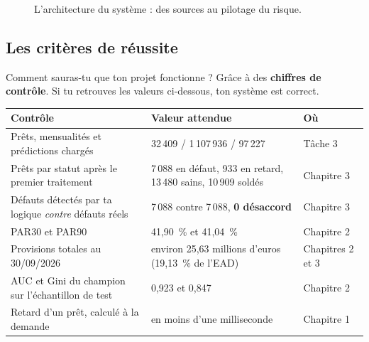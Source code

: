 \begin{figure}[ht]
\caption{L'architecture du système : des sources au pilotage du risque.}
\label{fig:architecture}
\end{figure}

\subsection{Les critères de réussite}

Comment sauras-tu que ton projet fonctionne ? Grâce à des \textbf{chiffres de contrôle}. Si tu
retrouves les valeurs ci-dessous, ton système est correct.

\begin{center}\small
\begin{tabularx}{\linewidth}{@{}L P{4.6cm} P{2.3cm}@{}}
\toprule
Contrôle & Valeur attendue & Où \\
\midrule
Prêts, mensualités et prédictions chargés & 32\,409 / 1\,107\,936 / 97\,227 & Tâche 3 \\
Prêts par statut après le premier traitement & 7\,088 en défaut, 933 en retard, 13\,480 sains,
10\,909 soldés & Chapitre 3 \\
Défauts détectés par ta logique \emph{contre} défauts réels & 7\,088 contre 7\,088, \textbf{0 désaccord} &
Chapitre 3 \\
PAR30 et PAR90 & 41,90~\% et 41,04~\% & Chapitre 2 \\
Provisions totales au 30/09/2026 & environ 25,63 millions d'euros (19,13~\% de l'EAD) & Chapitres 2 et 3 \\
AUC et Gini du champion sur l'échantillon de test & 0,923 et 0,847 & Chapitre 2 \\
Retard d'un prêt, calculé à la demande & en moins d'une milliseconde & Chapitre 1 \\
\bottomrule
\end{tabularx}
\end{center}

